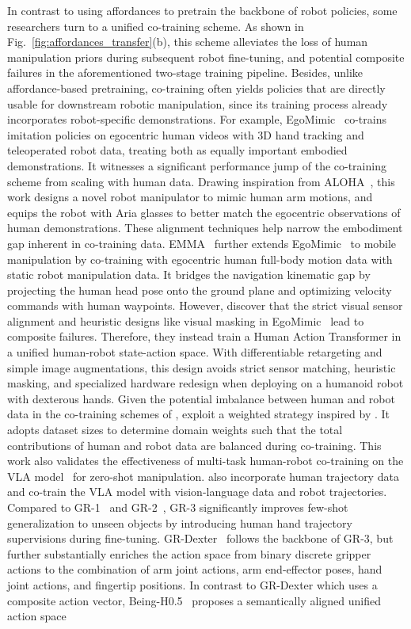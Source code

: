 \documentclass[Afour,sageh,times]{sagej}
\begin{document}
In contrast to using affordances to pretrain the backbone of robot policies, some researchers turn to a unified co-training scheme. As shown in Fig.~\ref{fig:affordances_transfer}(b), this scheme alleviates the loss of human manipulation priors during subsequent robot fine-tuning, and potential composite failures in the aforementioned two-stage training pipeline. Besides, unlike affordance-based pretraining, co-training often yields policies that are directly usable for downstream robotic manipulation, since its training process already incorporates robot-specific demonstrations. For example, EgoMimic~\citep{kareer2025egomimic} co-trains imitation policies on egocentric human videos with 3D hand tracking and teleoperated robot data, treating both as equally important embodied demonstrations. It witnesses a significant performance jump of the co-training scheme from scaling with human data. Drawing inspiration from ALOHA~\citep{zhao2023learning}, this work designs a novel robot manipulator to mimic human arm motions, and equips the robot with Aria glasses to better match the egocentric observations of human demonstrations. These alignment techniques help narrow the embodiment gap inherent in co-training data. EMMA~\citep{zhu2026emma} further extends EgoMimic~\citep{kareer2025egomimic} to mobile manipulation by co-training with egocentric human full-body motion data with static robot manipulation data. It bridges the navigation kinematic gap by projecting the human head pose onto the ground plane and optimizing velocity commands with human waypoints. However, \cite{qiu2025humanoid} discover that the strict visual sensor alignment and heuristic designs like visual masking in EgoMimic~\citep{kareer2025egomimic} lead to composite failures. Therefore, they instead train a Human Action Transformer in a unified human-robot state-action space. With differentiable retargeting and simple image augmentations, this design avoids strict sensor matching, heuristic masking, and specialized hardware redesign when deploying on a humanoid robot with dexterous hands. Given the potential imbalance between human and robot data in the co-training schemes of \cite{qiu2025humanoid}, \cite{yuan2025motiontrans} exploit a weighted strategy inspired by \cite{wei2025empirical}. It adopts dataset sizes to determine domain weights such that the total contributions of human and robot data are balanced during co-training. This work also validates the effectiveness of multi-task human-robot co-training on the VLA model~\citep{black2024pi_0} for zero-shot manipulation. \cite{cheang2025gr} also incorporate human trajectory data and co-train the VLA model with vision-language data and robot trajectories. Compared to GR-1~\citep{wu2023unleashing} and GR-2~\citep{cheang2024gr}, GR-3 significantly improves few-shot generalization to unseen objects by introducing human hand trajectory supervisions during fine-tuning. GR-Dexter~\citep{wen2025gr} follows the backbone of GR-3, but further substantially enriches the action space from binary discrete gripper actions to the combination of arm joint actions, arm end-effector poses, hand joint actions, and fingertip positions. In contrast to GR-Dexter which uses a composite action vector, Being-H0.5~\citep{luo2026being} proposes a semantically aligned unified action space 
\end{document}
